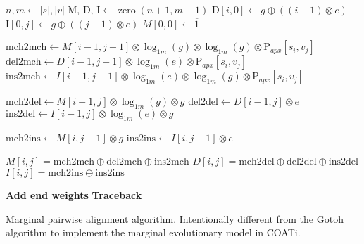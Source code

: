 \begin{algorithm}[hp]
\begin{algorithmic}[1]
  \State $n, m \gets |s|, |v|$
  \State $\text{M, D, I} \gets \operatorname{zero}(n+1, m+1)$ 
   
    \State $\text{D}[i, 0] \gets g \oplus ((i - 1) \otimes e)$
  \EndFor
   
    \State $\text{I}[0, j] \gets g \oplus ((j - 1) \otimes e)$
  \EndFor
  \State $M[0,0] \gets \overline{1}$ 

   
      \State $\text{mch2mch} \gets M[i-1, j-1] \otimes \log_{1m} (g) \otimes \log_{1m} (g) \otimes \text{P}_{apx}[s_i, v_j]$
      \State $\text{del2mch} \gets D[i-1, j-1] \otimes \log_{1m} (e) \otimes \text{P}_{apx}[s_i, v_j]$
      \State $\text{ins2mch} \gets I[i-1, j-1] \otimes \log_{1m} (e) \otimes \log_{1m} (g) \otimes \text{P}_{apx}[s_i, v_j]$

      \State $\text{mch2del} \gets M[i-1, j] \otimes \log_{1m} (g) \otimes g$
      \State $\text{del2del} \gets D[i-1, j] \otimes e$
      \State $\text{ins2del} \gets I[i-1, j] \otimes \log_{1m} (e) \otimes g$
      
      \State $\text{mch2ins} \gets M[i, j-1] \otimes g$
      \State $\text{ins2ins} \gets I[i, j-1] \otimes e$
        
      \State $M[i, j] = \text{mch2mch} \oplus \text{del2mch} \oplus \text{ins2mch}$ 
      \State $D[i, j] = \text{mch2del} \oplus \text{del2del} \oplus \text{ins2del}$ 
      \State $I[i, j] = \text{mch2ins} \oplus \text{ins2ins}$ 

    \EndFor
  \EndFor
\State \textbf{Add end weights}
\State \textbf{Traceback}
\EndFunction
\end{algorithmic}
\caption[Marginal and Modal Alignment Pseudocode]{Marginal pairwise alignment algorithm. Intentionally different from the Gotoh algorithm to implement the marginal evolutionary model in COATi.}\label{alg:alignpair}
\end{algorithm}